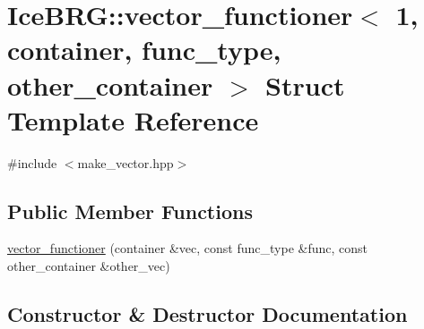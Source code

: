 \hypertarget{structIceBRG_1_1vector__functioner_3_011_00_01container_00_01func__type_00_01other__container_01_4}{}\section{Ice\+B\+R\+G\+:\+:vector\+\_\+functioner$<$ 1, container, func\+\_\+type, other\+\_\+container $>$ Struct Template Reference}
\label{structIceBRG_1_1vector__functioner_3_011_00_01container_00_01func__type_00_01other__container_01_4}


{\ttfamily \#include $<$make\+\_\+vector.\+hpp$>$}

\subsection*{Public Member Functions}
\begin{DoxyCompactItemize}
\item 
\hyperlink{structIceBRG_1_1vector__functioner_3_011_00_01container_00_01func__type_00_01other__container_01_4_adb22620b6ed368dfe6343bcea9690ca2}{vector\+\_\+functioner} (container \&vec, const func\+\_\+type \&func, const other\+\_\+container \&other\+\_\+vec)
\end{DoxyCompactItemize}


\subsection{Constructor \& Destructor Documentation}
\hypertarget{structIceBRG_1_1vector__functioner_3_011_00_01container_00_01func__type_00_01other__container_01_4_adb22620b6ed368dfe6343bcea9690ca2}{}
